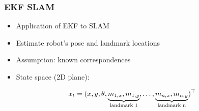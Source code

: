 \begin{frame}
    \frametitle{EKF SLAM}

    \begin{itemize}
        \item Application of EKF to SLAM
        \item Estimate robot's pose and landmark locations
        \item Assumption: known correspondences
        \item State space (2D plane):
    \end{itemize}
    \[ x_t = (x, y, \theta, \underbrace{m_{1,x}, m_{1,y}}_{\text{landmark 1}}, \ldots, \underbrace{m_{n,x}, m_{n,y}}_{\text{landmark n}} )^{\top} \]
\end{frame}

